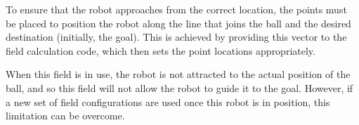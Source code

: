 \documentclass[10pt]{article}
\begin{document}
\begin{figure}
\end{figure}

To ensure that the robot approaches from the correct location, the points must
be placed to position the robot along the line that joins the ball and the
desired destination (initially, the goal).  This is achieved by providing this
vector to the field calculation code, which then sets the point locations
appropriately.

When this field is in use, the robot is not attracted to the actual position of
the ball, and so this field will not allow the robot to guide it to the goal.
However, if a new set of field configurations are used once this robot is in
position, this limitation can be overcome.
\end{document}
